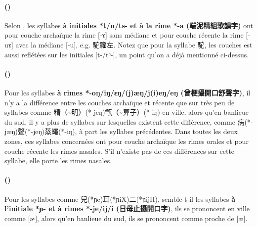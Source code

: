 \documentclass{scrbook}
\newcounter{c}[subsubsection]
\newcommand{\stpc}[1]{\stepcounter{#1}}
\newcommand{\bolang}{\textasciitilde}
\newcommand{\difwenbai}{couches archaïque et récente\xspace}
\newcommand{\termyyx}[1]{\textbf{#1}}
\begin{document}
\begin{sloppypar}
\stpc{c}\paragraph{()}
Selon \textcite{Wang1958Taiyuan}, les syllabes \termyyx{à initiales *t/n/ts- et à la rime *-a (端泥精組歌韻字)} ont pour couche archaïque la rime [-ɤ] sans médiane et pour couche récente la rime [-uɤ] avec la médiane [-u], e.g. 駝籮左. Notez que pour la syllabe 駝, les couches est aussi reflétées sur les initiales [t-/tʰ-], un point qu'on a déjà mentionné ci-dessus.

\stpc{c}\paragraph{()}
Pour les syllabes \termyyx{à rimes *-oŋ/iŋ/ɛŋ/(j)æŋ/j(i)eŋ/eŋ (曾梗攝開口舒聲字)}, il n'y a la différence entre les \difwenbai que sur très peu de syllabes comme 精（\bolang 明）(*-jeŋ)甑（\bolang 算子）(*-iŋ) en ville, alors qu'en banlieue du sud, il y a plus de syllabes sur lesquelles existent cette différence, comme 病(*-jæŋ)聲(*-jeŋ)蒸蠅(*-iŋ), à part les syllabes précédentes. Dans toutes les deux zones, ces syllabes concernées ont pour couche archaïque les rimes orales et pour couche récente les rimes nasales. S'il n'existe pas de ces différences sur cette syllabe, elle porte les rimes nasales.

\stpc{c}\paragraph{()}
Pour les syllabes comme 兒(*ɲe)耳(*ɲiX)二(*ɲijH), semble-t-il les syllabes \termyyx{à l'initiale *ɲ- et à rimes *-je/ij/i (日母止攝開口字)}, ils se prononcent en ville comme [ə˞], alors qu'en banlieue du sud, ils se prononcent comme proche de [æ].


\end{sloppypar}
\end{document}
